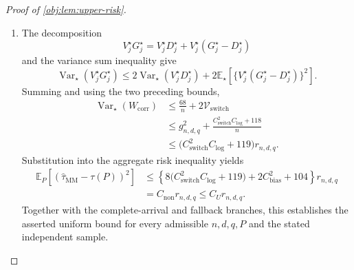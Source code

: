 \documentclass[11pt]{article}
\begin{document}
\begin{proof}[Proof of \cref{obj:lem:upper-risk}]
\begin{enumerate}
To convert the first term into the benchmark, define
\[
\Lambda_n=\frac{e^{\ell_n/8}\ell_n^3}{n}.
\]
Since \(\delta^2\le\delta\), \(\ell_n\le\ell_n^2\), and \(B=256\ell_n\),
\[
4\delta^2B^2+2\delta B
\le262656\,\delta\ell_n^2.
\]
Substitution of \(m=n/8\) gives the calibrated bound
\[
12d\,e^{\ell_n/8}
\frac{4\delta^2B^2+2\delta B}{m^2}
\le
C_{\mathrm{switch}}g_{n,d,q}\Lambda_n,
\qquad
C_{\mathrm{switch}}=12\cdot64\cdot262656.
\]
The sixth term of the exponential series yields
\[
\frac{(3\ell_n/4)^6}{720}\le e^{3\ell_n/4},
\qquad
\ell_n^6\le720(4/3)^6e^{3\ell_n/4}.
\]
Since \(e^{\ell_n}=e+n\le(e+1)n\),
\[
\Lambda_n^2
=\frac{e^{\ell_n/4}\ell_n^6}{n^2}
\le\frac{720(4/3)^6e^{\ell_n}}{n^2}
\le\frac{C_{\mathrm{log}}}{n}.
\]
Finally, the nonnegative square
\((g_{n,d,q}-C_{\mathrm{switch}}\Lambda_n)^2\) gives
\[
C_{\mathrm{switch}}g_{n,d,q}\Lambda_n
\le\frac{g_{n,d,q}^2}{2}
+\frac{C_{\mathrm{switch}}^2\Lambda_n^2}{2}
\le\frac{g_{n,d,q}^2}{2}
+\frac{C_{\mathrm{switch}}^2C_{\mathrm{log}}}{2n}.
\]
Consequently,
\[
\mathcal V_{\mathrm{switch}}
\le
\frac{g_{n,d,q}^2}{2}
+\frac{C_{\mathrm{switch}}^2C_{\mathrm{log}}/2+25}{n}.
\]

\item The decomposition
\[
V_j^\star G_j^\star
=V_j^\star D_j^\star
+V_j^\star(G_j^\star-D_j^\star)
\]
and the variance sum inequality give
\[
\operatorname{Var}_\star(V_j^\star G_j^\star)
\le
2\operatorname{Var}_\star(V_j^\star D_j^\star)
+2\mathbb E_\star[
\{V_j^\star(G_j^\star-D_j^\star)\}^2].
\]
Summing and using the two preceding bounds,
\[
\begin{aligned}
\operatorname{Var}_\star(W_{\mathrm{corr}})
&\le\frac{68}{n}+2\mathcal V_{\mathrm{switch}}\\
&\le
g_{n,d,q}^2+
\frac{C_{\mathrm{switch}}^2C_{\mathrm{log}}+118}{n}\\
&\le
\bigl(C_{\mathrm{switch}}^2C_{\mathrm{log}}+119\bigr)
r_{n,d,q}.
\end{aligned}
\]
Substitution into the aggregate risk inequality yields
\[
\begin{aligned}
\mathbb E_P[(\widehat\tau_{\mathrm{MM}}-\tau(P))^2]
&\le
\left\{
8\bigl(C_{\mathrm{switch}}^2C_{\mathrm{log}}+119\bigr)
+2C_{\mathrm{bias}}^2+104
\right\}r_{n,d,q}\\
&=C_{\mathrm{non}}r_{n,d,q}
\le C_Ur_{n,d,q}.
\end{aligned}
\]
Together with the complete-arrival and fallback branches, this establishes the asserted uniform bound for every admissible \(n,d,q,P\) and the stated independent sample.
\end{enumerate}
\end{proof}
\end{document}
